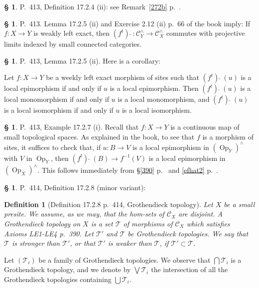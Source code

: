 \documentclass[12pt]{article}
\newtheorem{df}[thm]{Definition}
\theoremstyle{remark}
\theoremstyle{definition}
\newtheorem{s}[thm]{\S}
\newcommand{\cc}{\mathcal}
\newcommand{\oo}{\operatorname}
\newcommand{\C}{\mathcal C}
\newcommand{\fthat}{(f^t)\ \widehat{}\ }
\begin{document}
%

\begin{s}\label{1724ii}
P.~413, Definition 17.2.4 (ii): see  Remark~\ref{272b} p.~\pageref{272b}.
\end{s}

%

\begin{s}
P.~413. Lemma 17.2.5 (ii) and Exercise 2.12 (ii) p.~66 of the book imply: If $f:X\to Y$ is weakly left exact, then $\fthat:\C_Y^\wedge\to\C_X^\wedge$ commutes with projective limits indexed by small connected categories.
\end{s} 

%

\begin{s}\label{1725ii} 
P.~413, Lemma 17.2.5 (ii). Here is a corollary: 

Let $f:X\to Y$ be a weekly left exact morphism of sites such that $\fthat(u)$ is a local epimorphism if and only if $u$ is a local epimorphism. Then $\fthat(u)$ is a local monomorphism if and only if $u$ is a local monomorphism, and $\fthat(u)$ is a local isomorphism if and only if $u$ is a local isomorphism. 
\end{s} 

%

\begin{s}
P.~413, Example 17.2.7 (i). Recall that $f:X\to Y$ is a continuous map of small topological spaces. As explained in the book, to see that $f$ is a morphism of sites, it suffices to check that, if $u:B\to V$ is a local epimorphism in $(\oo{Op}_Y)^\wedge$ with $V$ in $\oo{Op}_Y$, then $\fthat(B)\to f^{-1}(V)$ is a local epimorphism in $(\oo{Op}_X)^\wedge$. This follows immediately from \S\ref{390} p.~\pageref{390} and \eqref{efhat2} p.~\pageref{efhat2}. 
\end{s}

%

\begin{s} 
P.~414, Definition 17.2.8 (minor variant):

\begin{df}[Definition 17.2.8 p.~414, Grothendieck topology]\label{1778} 
Let $X$ be a small presite. We assume, as we may, that the hom-sets of $\C_X$ are disjoint. A {\em Grothendieck topology} on $X$ is a set $\cc T$ of morphisms of $\C_X$ which satisfies Axioms LE1-LE4 p.~390. Let $\cc T'$ and $\cc T$ be Grothendieck topologies. We say that $\cc T$ is {\em stronger than} $\cc T'$, or that $\cc T'$ is {\em weaker than} $\cc T$, if $\cc T'\subset\cc T$. 
\end{df}

Let $(\cc T_i)$ be a family of Grothendieck topologies. We observe that $\bigcap\cc T_i$ is a Grothendieck topology, and we denote by $\bigvee\cc T_i$ the intersection of all the Grothendieck topologies containing $\bigcup\cc T_i$.
\end{s}
\end{document}
